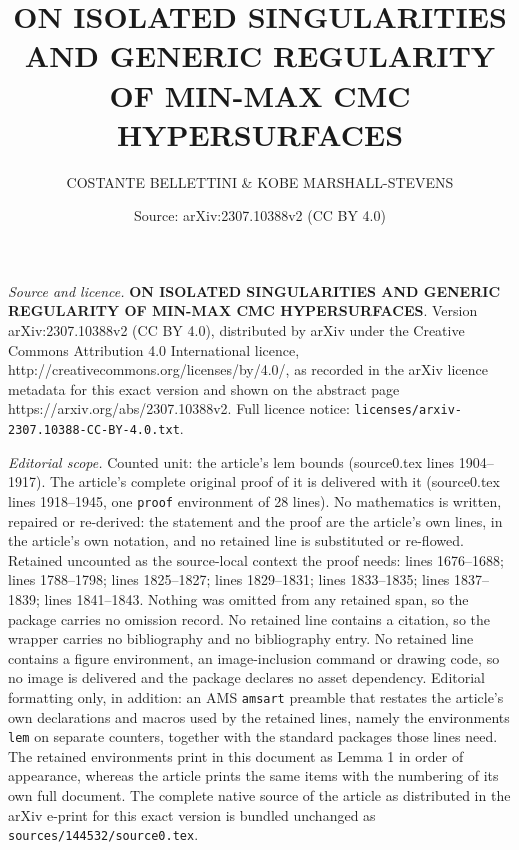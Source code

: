 \documentclass[10pt,a4paper]{amsart}
\title{\textbf{ON ISOLATED SINGULARITIES AND GENERIC REGULARITY OF MIN-MAX CMC HYPERSURFACES}}
\author{COSTANTE BELLETTINI \& KOBE MARSHALL-STEVENS}
\date{Source: arXiv:2307.10388v2 (CC BY 4.0)}
\begin{document}
\maketitle

\noindent\emph{Source and licence.} \textbf{ON ISOLATED SINGULARITIES AND GENERIC REGULARITY OF MIN-MAX CMC HYPERSURFACES}. Version arXiv:2307.10388v2 (CC BY 4.0), distributed by arXiv under the Creative Commons Attribution 4.0 International licence, http://creativecommons.org/licenses/by/4.0/, as recorded in the arXiv licence metadata for this exact version and shown on the abstract page https://arxiv.org/abs/2307.10388v2. Full licence notice: \texttt{licenses/arxiv-2307.10388-CC-BY-4.0.txt}.\par\smallskip

\noindent\textit{Editorial scope.} Counted unit: the article's lem bounds (source0.tex lines 1904--1917). The article's complete original proof of it is delivered with it (source0.tex lines 1918--1945, one \texttt{proof} environment of 28 lines). No mathematics is written, repaired or re-derived: the statement and the proof are the article's own lines, in the article's own notation, and no retained line is substituted or re-flowed.  Retained uncounted as the source-local context the proof needs: lines 1676--1688; lines 1788--1798; lines 1825--1827; lines 1829--1831; lines 1833--1835; lines 1837--1839; lines 1841--1843.  Nothing was omitted from any retained span, so the package carries no omission record.  No retained line contains a citation, so the wrapper carries no bibliography and no bibliography entry.  No retained line contains a figure environment, an image-inclusion command or drawing code, so no image is delivered and the package declares no asset dependency.  Editorial formatting only, in addition: an AMS \texttt{amsart} preamble that restates the article's own declarations and macros used by the retained lines, namely the environments \texttt{lem} on separate counters, together with the standard packages those lines need.  The retained environments print in this document as Lemma 1 in order of appearance, whereas the article prints the same items with the numbering of its own full document.  The complete native source of the article as distributed in the arXiv e-print for this exact version is bundled unchanged as \texttt{sources/144532/source0.tex}.
\end{document}
